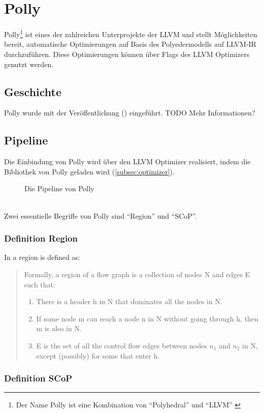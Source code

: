 \chapter{Polly}
Polly\footnote{Der Name Polly ist eine Kombination von \enquote{Polyhedral} und \enquote{\ac{LLVM}} \cite{PollyGrosser}} ist eines der zahlreichen Unterprojekte der \ac{LLVM} und stellt Möglichkeiten bereit, automatische Optimierungen auf Basis des Polyedermodells auf \ac{LLVM-IR} durchzuführen.
Diese Optimierungen können über Flags des \ac{LLVM} Optimizers genutzt werden.
\section{Geschichte}
Polly wurde mit der Veröffentlichung (\cite{PollyGrosser}) eingeführt. TODO Mehr Informationen?

\section{Pipeline \cite{PollyPresentation}}
Die Einbindung von Polly wird über den \ac{LLVM} Optimizer realisiert, indem die Bibliothek von Polly geladen wird (\autoref{subsec:optimizer}).
\begin{figure}[h]
    \caption{Die Pipeline von Polly}
    \centering
\end{figure}\\
Zwei essentielle Begriffe von Polly sind \enquote{Region} und \enquote{\ac{SCoP}}.
\subsection{Definition Region}
In \cite[chapter 9.7.1, p.~672]{Drachenbuch} a region is defined as:
\begin{comment}
    Seite 672, Chapter 9. Machine-independent optimizations, 9.7.1 Regions
\end{comment}
\begin{quote}
    Formally, a region of a flow graph is a collection of nodes N and edges E such that:
    \begin{enumerate}
        \item There is a header h in N that dominates all the nodes in N.
        \item If some node m can reach a node n in N without going through h, then m is also in N.
        \item E is the set of all the control flow edges between nodes \(n_1\) and \(n_2\) in N, except (possibly) for some that enter h.
    \end{enumerate}
\end{quote}
\subsection{Definition SCoP}
